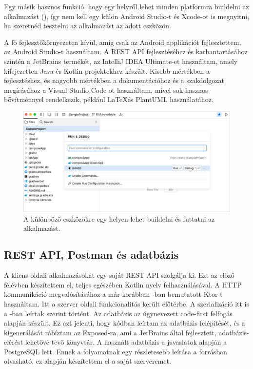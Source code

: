 Egy másik hasznos funkció, hogy egy helyről lehet minden platformra buildelni az alkalmazást (), így nem kell egy külön Android Studio-t és Xcode-ot is megnyitni, ha szeretnéd tesztelni az alkalmazást az adott eszközön.

A fő fejlesztőkörnyezeten kívül, amíg csak az Android applikációt fejlesztettem, az Android Studio-t használtam.  
A REST API fejlesztéséhez és karbantartásához szintén a JetBrains termékét, az IntelliJ IDEA Ultimate-et használtam, amely kifejezetten Java és Kotlin projektekhez készült.  
Kisebb mértékben a fejlesztéshez, és nagyobb mértékben a dokumentációhoz és a szakdolgozat megírásához a Visual Studio Code-ot használtam, mivel sok hasznos bővítménnyel rendelkezik, például \LaTeX és PlantUML használatához.

\begin{figure}[!ht]
    \centering
    \includegraphics[width=150mm, keepaspectratio]{figures/fleet-run-configurations.png}
    \caption{A különböző eszközökre egy helyen lehet buildelni és futtatni az alkalmazást. \cite{Fleet}}
    \label{fig:RunConfigs}
\end{figure}


\subsection{REST API, Postman és adatbázis}

A kliens oldali alkalmazásokat egy saját REST API szolgálja ki.  
Ezt az előző félévben készítettem el, teljes egészében Kotlin nyelv felhasználásával. A HTTP kommunikáció megvalósításához a már korábban -ban bemutatott Ktor-t használtam.  
Itt a szerver oldali funkcionalitás került előtérbe. A szerializáció itt is a -ban leírtak szerint történt.  
Az adatbázis az úgynevezett code-first felfogás alapján készült. Ez azt jelenti, hogy kódban leírtam az adatbázis felépítését, és a kigenerálását rábíztam az Exposed-ra, ami a JetBrains által fejlesztett, adatbázis-elérést lehetővé tevő könyvtár.  
A használt adatbázis a javaslatok alapján a PostgreSQL lett. Ennek a folyamatnak egy részletesebb leírása a \cite{Backend} forrásban olvasható, ez alapján készítettem el a saját szerveremet.


